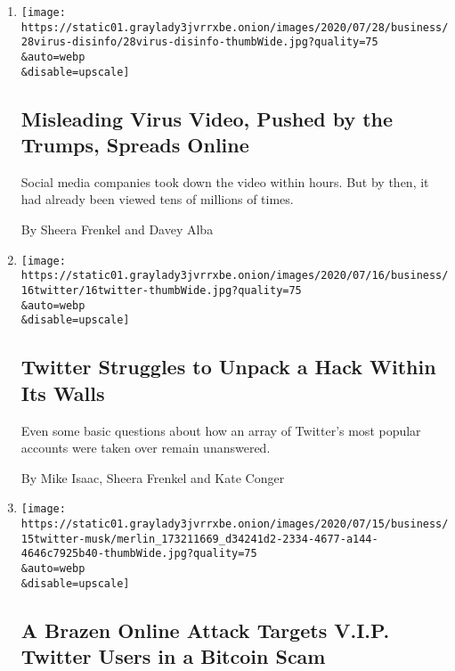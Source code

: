 \begin{enumerate}
\def\labelenumi{\arabic{enumi}.}
\item
  \href{/2020/07/28/technology/virus-video-trump.html}{}

  \texttt{[image: https://static01.graylady3jvrrxbe.onion/images/2020/07/28/business/28virus-disinfo/28virus-disinfo-thumbWide.jpg?quality=75\\\&auto=webp\\\&disable=upscale]}

  \hypertarget{misleading-virus-video-pushed-by-the-trumps-spreads-online}{%
  \subsection{Misleading Virus Video, Pushed by the Trumps, Spreads
  Online}\label{misleading-virus-video-pushed-by-the-trumps-spreads-online}}

  Social media companies took down the video within hours. But by then,
  it had already been viewed tens of millions of times.

  By Sheera Frenkel and Davey Alba
\item
  \href{/2020/07/16/technology/twitter-hack-investigation.html}{}

  \texttt{[image: https://static01.graylady3jvrrxbe.onion/images/2020/07/16/business/16twitter/16twitter-thumbWide.jpg?quality=75\\\&auto=webp\\\&disable=upscale]}

  \hypertarget{twitter-struggles-to-unpack-a-hack-within-its-walls}{%
  \subsection{Twitter Struggles to Unpack a Hack Within Its
  Walls}\label{twitter-struggles-to-unpack-a-hack-within-its-walls}}

  Even some basic questions about how an array of Twitter's most popular
  accounts were taken over remain unanswered.

  By Mike Isaac, Sheera Frenkel and Kate Conger
\item
  \href{/2020/07/15/technology/twitter-hack-bill-gates-elon-musk.html}{}

  \texttt{[image: https://static01.graylady3jvrrxbe.onion/images/2020/07/15/business/15twitter-musk/merlin\_173211669\_d34241d2-2334-4677-a144-4646c7925b40-thumbWide.jpg?quality=75\\\&auto=webp\\\&disable=upscale]}

  \hypertarget{a-brazen-online-attack-targets-vip-twitter-users-in-a-bitcoin-scam}{%
  \subsection{A Brazen Online Attack Targets V.I.P. Twitter Users in a
  Bitcoin
  Scam}\label{a-brazen-online-attack-targets-vip-twitter-users-in-a-bitcoin-scam}}


\end{enumerate}
